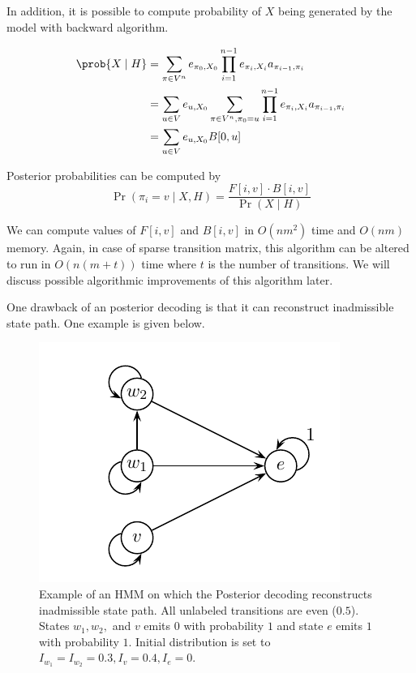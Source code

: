 In addition, it is possible to compute probability
of $X$ being generated by the model with backward algorithm.

\begin{align}
\prob{X\mid H} &= 
	\sum_{\pi\in V^n}
		e_{\pi_0,X_0}\prod_{i=1}^{n-1}e_{\pi_i,X_i}a_{\pi_{i-1},\pi_i}\\
	&=
	\sum_{u\in V}e_{u,X_0}
	\sum_{\pi\in V^n,\pi_0=u}
		\prod_{i=1}^{n-1}e_{\pi_i,X_i}a_{\pi_{i-1},\pi_i}\\
	&=
	\sum_{u\in V}e_{u,X_0}B[0,u]
\end{align}

Posterior probabilities can be computed by
\[\Pr\left(\pi_i=v\mid X,H\right) = \frac{F[i,v]\cdot B[i,v]}{\Pr\left( X\mid H
 \right)}\]


We can compute values of $F[i,v]$ and $B[i,v]$ in $O(nm^2)$ time and $O(nm)$
memory. Again, in case of sparse transition matrix, this algorithm can be
altered to run in $O(n(m+t))$ time where $t$ is the number of transitions. We
will discuss possible algorithmic improvements of this algorithm later.

One drawback of an  posterior decoding is that it can reconstruct inadmissible
state path. One example is given below.

\begin{figure}
\begin{center}
\includegraphics{../figures/posteriorInadmissibleStatePath.pdf}
\end{center}
\caption[Hidden Markov Model on which posterior decoding reconstructs
inadmissible state path]{
Example of an HMM on which the Posterior decoding reconstructs inadmissible state path. 
All unlabeled transitions are even ($0.5$). States $w_1,w_2,$ and $v$ emits $0$
with probability $1$ and state $e$ emits $1$ with probability $1$.
Initial distribution is set to $I_{w_1}=I_{w_2}=0.3, I_{v}=0.4, I_{e}=0$.
}\label{FIGURE:INADMISSIBLESTATEPATH}
\end{figure}

